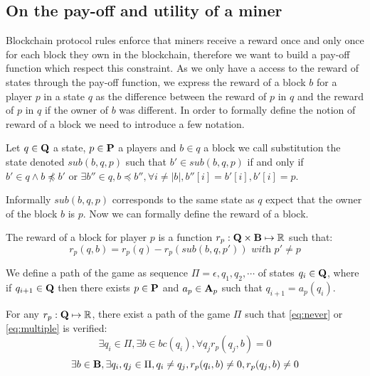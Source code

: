 \subsection{On the pay-off and utility of a miner}\label{sec-pay-ut}
Blockchain protocol rules enforce that miners receive a reward once and only once for each block they own
in the blockchain, therefore we want to build a pay-off function which respect this constraint. As we only have a access to the reward of states through the pay-off function, we express the reward of a block $b$ for a player $p$ in a state $q$ as the difference between the reward of $p$ in $q$ and the reward of $p$ in $q$ if the owner of $b$ was different.
In order to formally define the notion of reward of a block we need to introduce a few notation. 
\begin{mydef}
Let $q \in \mathbf{Q}$ a state, $p \in \mathbf{P}$ a players and $b \in q$ a block we call substitution the state denoted $sub(b,q,p)$ such that $b' \in sub(b,q,p)$ if and only if $b' \in q \land b \not \preceq b'$ or $\exists b'' \in q, b \preceq b'', \forall i \neq |b|, b''[i] = b'[i], b'[i] = p$.
\end{mydef}
Informally $sub(b,q,p)$ corresponds to the same state as $q$ expect that the owner of the block $b$ is $p$.
Now we can formally define the reward of a block.
\begin{mydef}
The reward of a block for player $p$ is a function $r_p : \mathbf{Q}  \times \text{\bf B} \mapsto \mathbb{R}$ such that:
\begin{equation*}
r_p(q,b) = r_p(q) - r_p(sub(b,q,p')) \textit{ with } p' \neq p
\end{equation*}
\end{mydef}

We define a path of the game as sequence $\Pi = \epsilon,q_1,q_2,\cdots$ of states $q_i \in \mathbf{Q}$, where if $q_{i+1} \in \mathbf{Q}$ then there exists $p \in \mathbf{P}$ and $a_p \in \mathbf{A}_p$ such that $q_{i+1}= a_p(q_i)$.

\begin{myprop}\label{prop:impo}
For any $r_p: \mathbf{Q}  \mapsto \mathbb{R}$, there exist a path of the game $\Pi$ such that \ref{eq:never} or \ref{eq:multiple} is verified:
\begin{equation}\label{eq:never}
\exists q_i \in \Pi,\exists b \in bc(q_i), \forall q_{j} r_p(q_{j},b) = 0
\end{equation}
\begin{equation}\label{eq:multiple}
\exists b \in \text{\bf B}, \exists q_i,q_{j} \in \Pi, q_i \neq q_{j}, r_p(q_i,b) \neq 0,  r_p(q_{j},b) \neq 0
\end{equation}
\end{myprop}

